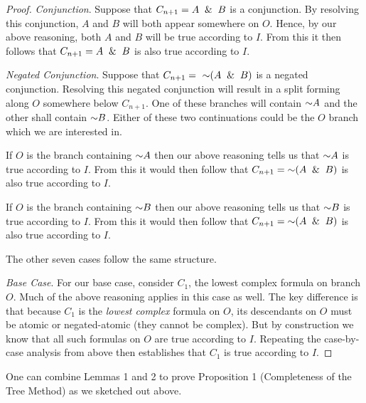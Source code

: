\documentclass[options]{philosophersimprint}
\begin{document}
\begin{proof}
\textit{Conjunction}. Suppose that $C_{n+1}= A \ \mathbin{\&} \  B$ is a conjunction. By resolving this conjunction, $A$ and $B$ will both appear somewhere on $O$. Hence, by our above reasoning, both $A$ and $B$ will be true according to $I$. From this it then follows that $C_{n+1}= A \ \mathbin{\&} \  B$ is also true according to $I$.

\textit{Negated Conjunction}. Suppose that $C_{n+1}= \ \mathord{\sim}(A \ \mathbin{\&} \  B)$ is a negated conjunction. Resolving this negated conjunction will result in a split forming along $O$ somewhere below $C_{n+1}$. One of these branches will contain $\mathord{\sim} A$ and the other shall contain $\mathord{\sim} B$. Either of these two continuations could be the $O$ branch which we are interested in.

If $O$ is the branch containing $\mathord{\sim} A$ then our above reasoning tells us that $\mathord{\sim} A$ is true according to $I$. From this it would then follow that $C_{n+1}= \mathord{\sim}(A \ \mathbin{\&} \  B)$ is also true according to $I$.

If $O$ is the branch containing $\mathord{\sim} B$ then our above reasoning tells us that $\mathord{\sim} B$ is true according to $I$. From this it would then follow that $C_{n+1}= \mathord{\sim}(A \ \mathbin{\&} \  B)$ is also true according to $I$.

The other seven cases follow the same structure.

\textit{Base Case}. For our base case, consider $C_1$, the lowest complex formula on branch $O$. Much of the above reasoning applies in this case as well. The key difference is that because $C_1$ is the \textit{lowest complex} formula on $O$, its descendants on $O$ must be atomic or negated-atomic (they cannot be complex). But by construction we know that all such formulas on $O$ are true according to $I$. Repeating the case-by-case analysis from above then establishes that $C_1$ is true according to $I$.
\end{proof}
One can combine Lemmas 1 and 2 to prove Proposition 1 (Completeness of the Tree Method) as we sketched out above.
\end{document}
